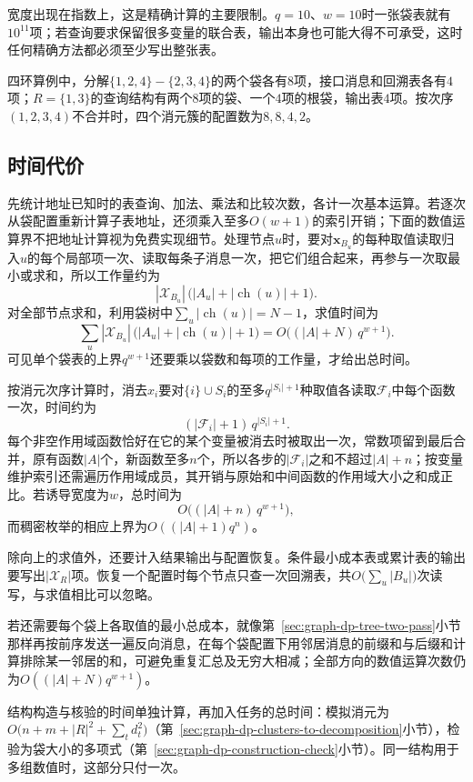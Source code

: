 宽度出现在指数上，这是精确计算的主要限制。$q=10$、$w=10$时一张袋表就有$10^{11}$项；若查询要求保留很多变量的联合表，输出本身也可能大得不可承受，这时任何精确方法都必须至少写出整张表。

四环算例中，分解$\{1,2,4\}-\{2,3,4\}$的两个袋各有$8$项，接口消息和回溯表各有$4$项；$R=\{1,3\}$的查询结构有两个$8$项的袋、一个$4$项的根袋，输出表$4$项。按次序$(1,2,3,4)$不合并时，四个消元簇的配置数为$8,8,4,2$。

\subsection{时间代价}
\label{sec:graph-dp-time-cost}

先统计地址已知时的表查询、加法、乘法和比较次数，各计一次基本运算。若逐次从袋配置重新计算子表地址，还须乘入至多$O(w+1)$的索引开销；下面的数值运算界不把地址计算视为免费实现细节。处理节点$u$时，要对$\bm x_{B_u}$的每种取值读取归入$u$的每个局部项一次、读取每条子消息一次，把它们组合起来，再参与一次取最小或求和，所以工作量约为
\[
|\mathcal X_{B_u}|\,\bigl(|A_u|+|\operatorname{ch}(u)|+1\bigr).
\]
对全部节点求和，利用袋树中$\sum_u|\operatorname{ch}(u)|=N-1$，求值时间为
\[
\sum_{u}|\mathcal X_{B_u}|\,\bigl(|A_u|+|\operatorname{ch}(u)|+1\bigr)=O\bigl((|A|+N)\,q^{w+1}\bigr).
\]
可见单个袋表的上界$q^{w+1}$还要乘以袋数和每项的工作量，才给出总时间。

按消元次序计算时，消去$x_i$要对$\{i\}\cup S_i$的至多$q^{|S_i|+1}$种取值各读取$\mathcal F_i$中每个函数一次，时间约为
\[
(|\mathcal F_i|+1)\,q^{|S_i|+1}.
\]
每个非空作用域函数恰好在它的某个变量被消去时被取出一次，常数项留到最后合并，原有函数$|A|$个，新函数至多$n$个，所以各步的$|\mathcal F_i|$之和不超过$|A|+n$；按变量维护索引还需遍历作用域成员，其开销与原始和中间函数的作用域大小之和成正比。若诱导宽度为$w$，总时间为
\[
O\bigl((|A|+n)\,q^{w+1}\bigr),
\]
而稠密枚举的相应上界为$O((|A|+1)q^n)$。

除向上的求值外，还要计入结果输出与配置恢复。条件最小成本表或累计表的输出要写出$|\mathcal X_R|$项。恢复一个配置时每个节点只查一次回溯表，共$O\bigl(\sum_u|B_u|\bigr)$次读写，与求值相比可以忽略。

若还需要每个袋上各取值的最小总成本，就像第~\ref{sec:graph-dp-tree-two-pass}小节那样再按前序发送一遍反向消息，在每个袋配置下用邻居消息的前缀和与后缀和计算排除某一邻居的和，可避免重复汇总及无穷大相减；全部方向的数值运算次数仍为$O((|A|+N)q^{w+1})$。

结构构造与核验的时间单独计算，再加入任务的总时间：模拟消元为$O\bigl(n+m+|R|^2+\sum_t d_t^2\bigr)$（第~\ref{sec:graph-dp-clusters-to-decomposition}小节），检验为袋大小的多项式（第~\ref{sec:graph-dp-construction-check}小节）。同一结构用于多组数值时，这部分只付一次。

